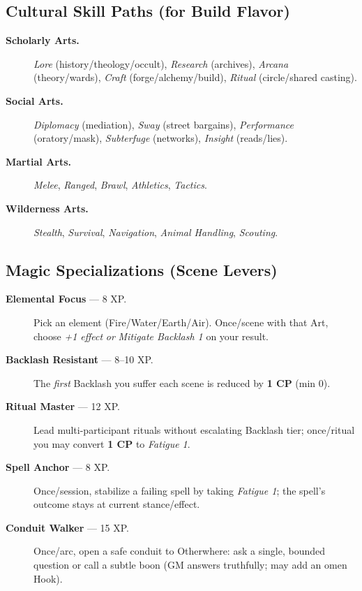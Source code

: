 \documentclass[11pt]{article}
\begin{document}
\subsection*{Cultural Skill Paths (for Build Flavor)}
\begin{description}
  \item[\textbf{Scholarly Arts.}] \emph{Lore} (history/theology/occult), \emph{Research} (archives), \emph{Arcana} (theory/wards), \emph{Craft} (forge/alchemy/build), \emph{Ritual} (circle/shared casting).
  \item[\textbf{Social Arts.}] \emph{Diplomacy} (mediation), \emph{Sway} (street bargains), \emph{Performance} (oratory/mask), \emph{Subterfuge} (networks), \emph{Insight} (reads/lies).
  \item[\textbf{Martial Arts.}] \emph{Melee}, \emph{Ranged}, \emph{Brawl}, \emph{Athletics}, \emph{Tactics}.
  \item[\textbf{Wilderness Arts.}] \emph{Stealth}, \emph{Survival}, \emph{Navigation}, \emph{Animal Handling}, \emph{Scouting}.
\end{description}

\subsection*{Magic Specializations (Scene Levers)}
\begin{description}
  \item[\textbf{Elemental Focus} — 8 XP.] Pick an element (Fire/Water/Earth/Air). Once/scene with that Art, choose \emph{+1 effect} \emph{or} \emph{Mitigate Backlash 1} on your result.
  \item[\textbf{Backlash Resistant} — 8–10 XP.] The \emph{first} Backlash you suffer each scene is reduced by \textbf{1 CP} (min 0).
  \item[\textbf{Ritual Master} — 12 XP.] Lead multi-participant rituals without escalating Backlash tier; once/ritual you may convert \textbf{1 CP} to \emph{Fatigue 1}.
  \item[\textbf{Spell Anchor} — 8 XP.] Once/session, stabilize a failing spell by taking \emph{Fatigue 1}; the spell’s outcome stays at current stance/effect.
  \item[\textbf{Conduit Walker} — 15 XP.] Once/arc, open a safe conduit to Otherwhere: ask a single, bounded question or call a subtle boon (GM answers truthfully; may add an omen Hook).
\end{description}
\end{document}

